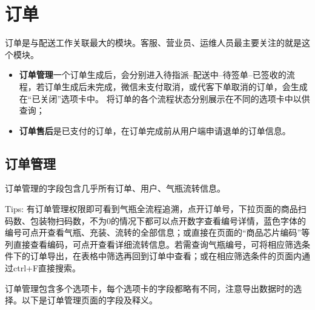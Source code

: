 \documentclass[UTF8]{ctexart}
\begin{document}
\section{订单}

订单是与配送工作关联最大的模块。客服、营业员、运维人员最主要关注的就是这个模块。
\begin{itemize}
	\item \textbf{订单管理}一个订单生成后，会分别进入待指派--配送中--待签单--已签收的流程，若订单生成后未完成，微信未支付取消，或代客下单取消的订单，会生成在“已关闭”选项卡中。
将订单的各个流程状态分别展示在不同的选项卡中以供查询；
    \item \textbf{订单售后}是已支付的订单，在订单完成前从用户端申请退单的订单信息。
\end{itemize}
\subsection{订单管理}

订单管理的字段包含几乎所有订单、用户、气瓶流转信息。

Tips: 有订单管理权限即可看到气瓶全流程追溯，点开订单号，下拉页面的商品扫码数、包装物扫码数，不为0的情况下都可以点开数字查看编号详情，蓝色字体的编号可点开查看气瓶、充装、流转的全部信息；或直接在页面的“商品芯片编码”等列直接查看编码，可点开查看详细流转信息。若需查询气瓶编号，可将相应筛选条件下的订单导出，在表格中筛选再回到订单中查看；或在相应筛选条件的页面内通过ctrl+F直接搜索。

订单管理包含多个选项卡，每个选项卡的字段都略有不同，注意导出数据时的选择。以下是订单管理页面的字段及释义。
\end{document}
